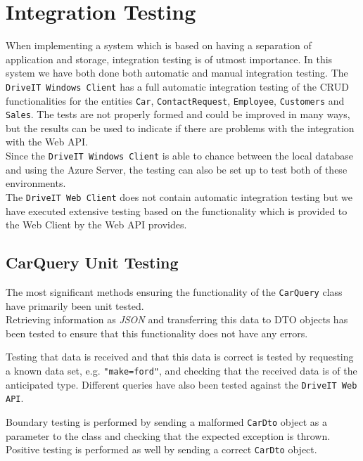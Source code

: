 \section{Integration Testing}
When implementing a system which is based on having a separation of application and storage, integration testing is of utmost importance. In this system we have both done both automatic and manual integration testing. The \texttt{DriveIT Windows Client} has a full automatic integration testing of the CRUD functionalities for the entities \texttt{Car}, \texttt{ContactRequest}, \texttt{Employee}, \texttt{Customers} and \texttt{Sales}. The tests are not properly formed and could be improved in many ways, but the results can be used to indicate if there are problems with the integration with the Web API.\\
Since the \texttt{DriveIT Windows Client} is able to chance between the local database and using the Azure Server, the testing can also be set up to test both of these environments. \\
The \texttt{DriveIT Web Client} does not contain automatic integration testing but we have executed extensive testing based on the functionality which is provided to the Web Client by the Web API provides.

\subsection{CarQuery Unit Testing}
The most significant methods ensuring the functionality of the \texttt{CarQuery} class have primarily been unit tested.\\
Retrieving information as \textit{JSON} and transferring this data to DTO objects has been tested to ensure that this functionality does not have any errors.

Testing that data is received and that this data is correct is tested by requesting a known data set, e.g. \texttt{"make=ford"}, and checking that the received data is of the anticipated type. Different queries have also been tested against the \texttt{DriveIT Web API}.

Boundary testing is performed by sending a malformed \texttt{CarDto} object as a parameter to the class and checking that the expected exception is thrown. Positive testing is performed as well by sending a correct \texttt{CarDto} object.